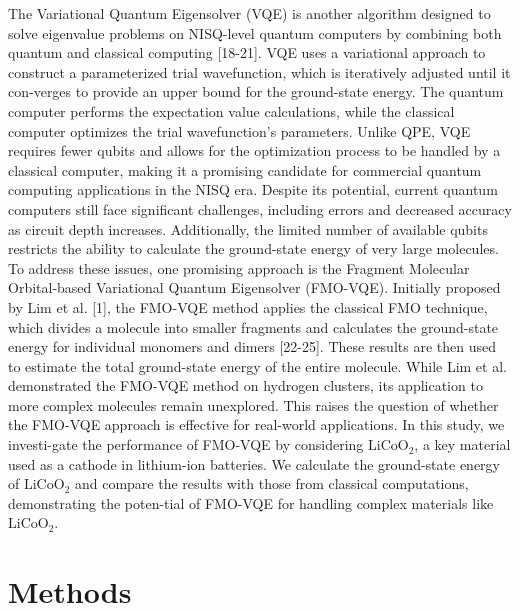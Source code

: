 \documentclass[pdflatex,sn-mathphys-num]{sn-jnl}%
\theoremstyle{thmstyleone}%
\theoremstyle{thmstyletwo}%
\theoremstyle{thmstylethree}%
\begin{document}
The Variational Quantum Eigensolver (VQE) is another algorithm designed to solve eigenvalue problems on NISQ-level quantum computers by combining both quantum and classical computing [18-21].
VQE uses a variational approach to construct a parameterized trial wavefunction, which is iteratively adjusted until it con-verges to provide an upper bound for the ground-state energy. 
The quantum computer performs the expectation value calculations, while the classical computer optimizes the trial wavefunction’s parameters.
Unlike QPE, VQE requires fewer qubits and allows for the optimization process to be handled by a classical computer, 
making it a promising candidate for commercial quantum computing applications in the NISQ era. 
Despite its potential, current quantum computers still face significant challenges, including errors and decreased accuracy as circuit depth increases. 
Additionally, the limited number of available qubits restricts the ability to calculate the ground-state energy of very large molecules. 
To address these issues, one promising approach is the Fragment Molecular Orbital-based Variational Quantum Eigensolver (FMO-VQE).
Initially proposed by Lim et al. [1], the FMO-VQE method applies the classical FMO technique, which divides a molecule into smaller fragments and calculates the ground-state energy for individual monomers and dimers [22-25]. 
These results are then used to estimate the total ground-state energy of the entire molecule. 
While Lim et al. demonstrated the FMO-VQE method on hydrogen clusters, its application to more complex molecules remain unexplored. 
This raises the question of whether the FMO-VQE approach is effective for real-world applications. 
In this study, we investi-gate the performance of FMO-VQE by considering \(\mathrm{LiCoO_2}\), a key material used as a cathode in lithium-ion batteries. We calculate the ground-state energy of \(\mathrm{LiCoO_2}\) and compare the results with those from classical computations, demonstrating the poten-tial of FMO-VQE for handling complex materials like \(\mathrm{LiCoO_2}\).

\section{Methods}\label{sec2}
\end{document}
